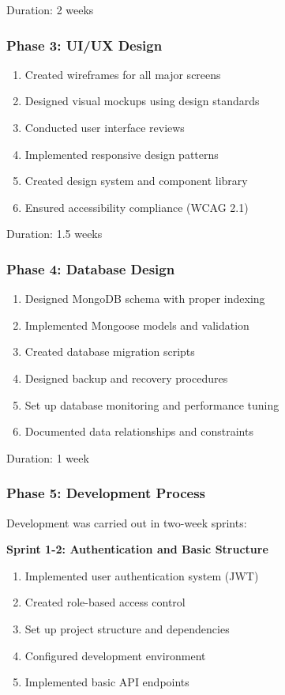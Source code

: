 \documentclass[12pt,a4paper]{report}
\begin{document}
Duration: 2 weeks

\subsubsection{Phase 3: UI/UX Design}

\begin{enumerate}[label=\roman*)]
    \item Created wireframes for all major screens
    \item Designed visual mockups using design standards
    \item Conducted user interface reviews
    \item Implemented responsive design patterns
    \item Created design system and component library
    \item Ensured accessibility compliance (WCAG 2.1)
\end{enumerate}

Duration: 1.5 weeks

\subsubsection{Phase 4: Database Design}

\begin{enumerate}[label=\roman*)]
    \item Designed MongoDB schema with proper indexing
    \item Implemented Mongoose models and validation
    \item Created database migration scripts
    \item Designed backup and recovery procedures
    \item Set up database monitoring and performance tuning
    \item Documented data relationships and constraints
\end{enumerate}

Duration: 1 week

\subsubsection{Phase 5: Development Process}

Development was carried out in two-week sprints:

\textbf{Sprint 1-2: Authentication and Basic Structure}
\begin{enumerate}[label=\roman*)]
    \item Implemented user authentication system (JWT)
    \item Created role-based access control
    \item Set up project structure and dependencies
    \item Configured development environment
    \item Implemented basic API endpoints
\end{enumerate}
\end{document}
